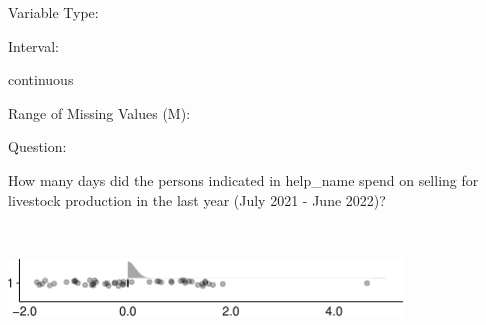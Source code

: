 \documentclass[
]{article}
\begin{document}
\begin{minipage}[t]{0.3\linewidth}

Variable Type:

\end{minipage}%
\begin{minipage}[t]{0.7\linewidth}

\end{minipage}

\begin{minipage}[t]{0.3\linewidth}

Interval:

\end{minipage}%
\begin{minipage}[t]{0.7\linewidth}

continuous

\end{minipage}

\begin{minipage}[t]{0.3\linewidth}

Range of Missing Values (M):

\end{minipage}%
\begin{minipage}[t]{0.7\linewidth}

\end{minipage}

\begin{minipage}[t]{0.3\linewidth}

Question:

\end{minipage}%
\begin{minipage}[t]{0.7\linewidth}

How many days did the persons indicated in help\_name spend on selling
for livestock production in the last year (July 2021 - June 2022)?

\end{minipage}

\begin{minipage}[t]{0.3\linewidth}

~

\end{minipage}%
\begin{minipage}[t]{0.7\linewidth}

\includegraphics[width=396px]{codebook_template_files/figure-latex/q7_40_rainplot-1}

\end{minipage}
 \vspace*{-6mm} 
\end{document}
